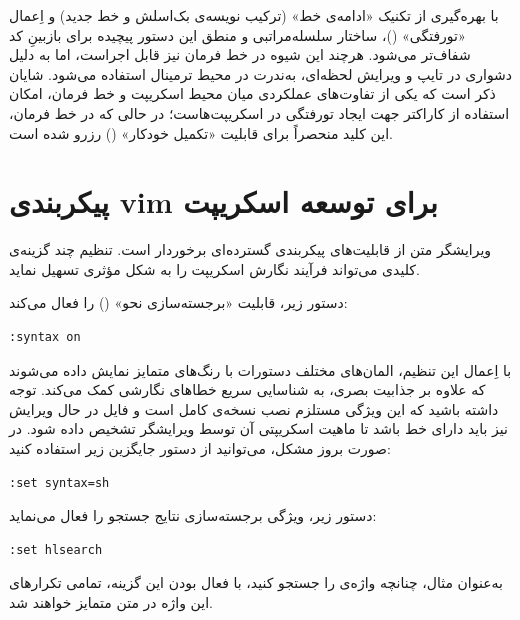 با بهره‌گیری از تکنیک «ادامه‌ی خط» (ترکیب نویسه‌ی بک‌اسلش \cmd{\textbackslash} و خط جدید) و اِعمال «تورفتگی» ()، ساختار سلسله‌مراتبی و منطق این دستور پیچیده برای بازبینِ کد شفاف‌تر می‌شود. هرچند این شیوه در خط فرمان نیز قابل اجراست، اما به دلیل دشواری در تایپ و ویرایش لحظه‌ای، به‌ندرت در محیط ترمینال استفاده می‌شود. شایان ذکر است که یکی از تفاوت‌های عملکردی میان محیط اسکریپت و خط فرمان، امکان استفاده از کاراکتر  جهت ایجاد تورفتگی در اسکریپت‌هاست؛ در حالی که در خط فرمان، این کلید منحصراً برای قابلیت «تکمیل خودکار» () رزرو شده است.

\section{پیکربندی vim برای توسعه اسکریپت}

ویرایشگر متن  از قابلیت‌های پیکربندی گسترده‌ای برخوردار است. تنظیم چند گزینه‌ی کلیدی می‌تواند فرآیند نگارش اسکریپت را به شکل مؤثری تسهیل نماید.

دستور زیر، قابلیت «برجسته‌سازی نحو» () را فعال می‌کند:

\begin{latin}
\begin{lstlisting}
:syntax on
\end{lstlisting}
\end{latin}

با اِعمال این تنظیم، المان‌های مختلف دستورات با رنگ‌های متمایز نمایش داده می‌شوند که علاوه بر جذابیت بصری، به شناسایی سریع خطاهای نگارشی کمک می‌کند. توجه داشته باشید که این ویژگی مستلزم نصب نسخه‌ی کامل  است و فایل در حال ویرایش نیز باید دارای خط  باشد تا ماهیت اسکریپتی آن توسط ویرایشگر تشخیص داده شود. در صورت بروز مشکل، می‌توانید از دستور جایگزین زیر استفاده کنید:

\begin{latin}
\begin{lstlisting}
:set syntax=sh
\end{lstlisting}
\end{latin}

دستور زیر، ویژگی برجسته‌سازی نتایج جستجو را فعال می‌نماید:

\begin{latin}
\begin{lstlisting}
:set hlsearch
\end{lstlisting}
\end{latin}

به‌عنوان مثال، چنانچه واژه‌ی  را جستجو کنید، با فعال بودن این گزینه، تمامی تکرارهای این واژه در متن متمایز خواهند شد.

